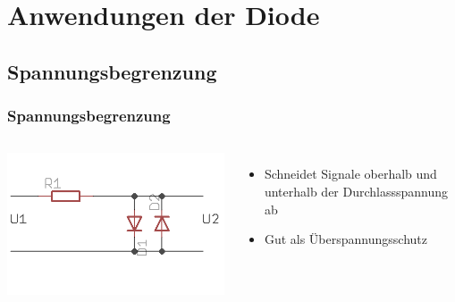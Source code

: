 \section*{Anwendungen der Diode}

\subsection*{Spannungs\-begrenzung}
\begin{frame}
    \frametitle{Spannungsbegrenzung}
    \begin{columns}[c]
        \begin{center}
            \includegraphics[width=1\textwidth]{a05/spannungsBegrenz.png}\\
            \tiny \hyperlink{refs}{\cite{wm}}
        \end{center}
    \begin{itemize}
			\item Schneidet Signale oberhalb und unterhalb der Durchlassspannung ab
			\item Gut als Überspannungsschutz
    \end{itemize}
    \end{columns}
\end{frame}


